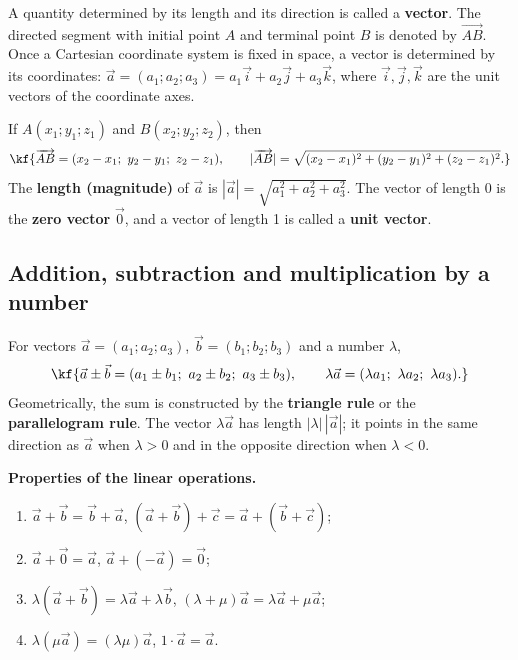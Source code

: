 
\begin{tarif}
A quantity determined by its length and its direction is called a
\textbf{vector}. The directed segment with initial point $A$ and terminal
point $B$ is denoted by $\overrightarrow{AB}$. Once a Cartesian coordinate
system is fixed in space, a vector is determined by its coordinates:
$\vec a=(a_1;a_2;a_3)=a_1\vec i+a_2\vec j+a_3\vec k$, where
$\vec i,\vec j,\vec k$ are the unit vectors of the coordinate axes.
\end{tarif}

If $A(x_1;y_1;z_1)$ and $B(x_2;y_2;z_2)$, then
\[\kf{\overrightarrow{AB}=(x_2-x_1;\ y_2-y_1;\ z_2-z_1),\qquad
|\overrightarrow{AB}|=\sqrt{(x_2-x_1)^2+(y_2-y_1)^2+(z_2-z_1)^2}.}\]
The \textbf{length (magnitude)} of $\vec a$ is
$|\vec a|=\sqrt{a_1^2+a_2^2+a_3^2}$.
The vector of length 0 is the \textbf{zero vector} $\vec 0$, and a vector
of length 1 is called a \textbf{unit vector}.

\subsection{Addition, subtraction and multiplication by a number}

\begin{tarif}
For vectors $\vec a=(a_1;a_2;a_3)$, $\vec b=(b_1;b_2;b_3)$ and a number $\lambda$,
\[\kf{\vec a\pm\vec b=(a_1\pm b_1;\ a_2\pm b_2;\ a_3\pm b_3),\qquad
\lambda\vec a=(\lambda a_1;\ \lambda a_2;\ \lambda a_3).}\]
Geometrically, the sum is constructed by the \textbf{triangle rule} or the
\textbf{parallelogram rule}. The vector $\lambda\vec a$ has length
$|\lambda|\,|\vec a|$; it points in the same direction as $\vec a$ when
$\lambda>0$ and in the opposite direction when $\lambda<0$.
\end{tarif}

\textbf{Properties of the linear operations.}
\begin{enumerate}[label=\arabic*)]
\item $\vec a+\vec b=\vec b+\vec a$, \quad $(\vec a+\vec b)+\vec c=\vec a+(\vec b+\vec c)$;
\item $\vec a+\vec 0=\vec a$, \quad $\vec a+(-\vec a)=\vec 0$;
\item $\lambda(\vec a+\vec b)=\lambda\vec a+\lambda\vec b$, \quad $(\lambda+\mu)\vec a=\lambda\vec a+\mu\vec a$;
\item $\lambda(\mu\vec a)=(\lambda\mu)\vec a$, \quad $1\cdot\vec a=\vec a$.
\end{enumerate}

